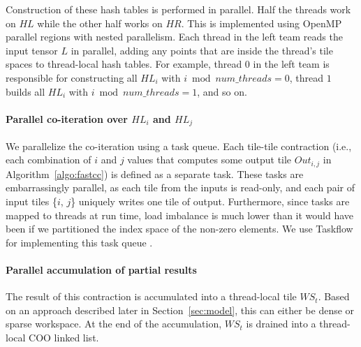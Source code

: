Construction of these hash tables is performed in parallel.
Half the threads work on $\mathit{HL}$ while the other half works on $\mathit{HR}$.
This is implemented using OpenMP parallel regions with nested parallelism.
Each thread in the left team reads the input tensor $L$ in parallel, adding any points that are inside the thread's tile spaces to thread-local hash tables.
For example, thread $0$ in the left team is responsible for constructing all $\mathit{HL}_i$ with $i \bmod \mathit{num\_threads} = 0$, thread $1$ builds all $\mathit{HL}_i$ with $i \bmod \mathit{num\_threads} = 1$, and so on. 

\paragraph{Parallel co-iteration over $\mathit{HL}_i$ and $\mathit{HL}_j$}
We parallelize the co-iteration using a task queue.
Each tile-tile contraction (i.e., each combination of $i$ and $j$ values that computes some output tile $\mathit{Out}_{i,j}$ in Algorithm~\ref{algo:fastcc}) is defined as a separate task. These tasks are embarrassingly parallel, as each tile from the inputs is read-only, and each pair of input tiles \{$i$, $j$\} uniquely writes one tile of output.
Furthermore, since tasks are mapped to threads at run time, load imbalance is much lower than it would have been if we partitioned the index space of the non-zero elements. We use Taskflow for implementing this task queue \cite{taskflow}.


\paragraph{Parallel accumulation of partial results}
The result of this contraction is accumulated into a thread-local tile $\mathit{WS}_t$.
Based on an approach described later in Section~\ref{sec:model}, this can either be dense or sparse workspace.
At the end of the accumulation, $\mathit{WS}_t$ is drained into a thread-local COO linked list.

